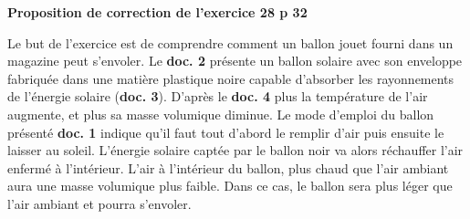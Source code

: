 	\begin{center}
		{\LARGE \textbf{Proposition de correction de l'exercice 28 p 32}}
	\end{center}
	
	Le but de l'exercice est de comprendre comment un ballon jouet fourni dans un magazine peut s'envoler.
	Le \textbf{doc. 2} présente un ballon solaire avec son enveloppe fabriquée dans une matière plastique noire capable d'absorber les rayonnements de l'énergie solaire (\textbf{doc. 3}).
	D'après le \textbf{doc. 4} plus la température de l'air augmente, et plus sa masse volumique diminue.
	Le mode d'emploi du ballon présenté \textbf{doc. 1} indique qu'il faut tout d'abord le remplir d'air puis ensuite le laisser au soleil.
	L'énergie solaire captée par le ballon noir va alors réchauffer l'air enfermé à l'intérieur. 
	L'air à l'intérieur du ballon, plus chaud que l'air ambiant aura une masse volumique plus faible.
	Dans ce cas, le ballon sera plus léger que l'air ambiant et pourra s'envoler.
	
%	
